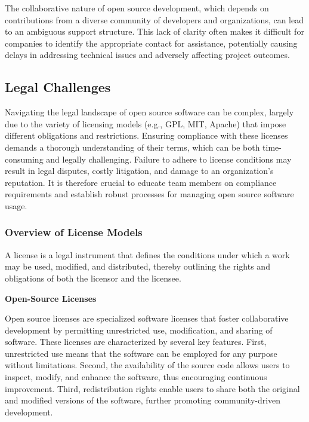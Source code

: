 The collaborative nature of open source development, which depends on contributions from a diverse community of developers and organizations, can lead to an ambiguous support structure. This lack of clarity often makes it difficult for companies to identify the appropriate contact for assistance, potentially causing delays in addressing technical issues and adversely affecting project outcomes.

\subsection{Legal Challenges}

Navigating the legal landscape of open source software can be complex, largely due to the variety of licensing models (e.g., GPL, MIT, Apache) that impose different obligations and restrictions. Ensuring compliance with these licenses demands a thorough understanding of their terms, which can be both time-consuming and legally challenging. Failure to adhere to license conditions may result in legal disputes, costly litigation, and damage to an organization’s reputation. It is therefore crucial to educate team members on compliance requirements and establish robust processes for managing open source software usage.

\cite{OpenSource-Legal-Guide}

\subsubsection{Overview of License Models}

A license is a legal instrument that defines the conditions under which a work may be used, modified, and distributed, thereby outlining the rights and obligations of both the licensor and the licensee.

\textbf{Open-Source Licenses}

Open source licenses are specialized software licenses that foster collaborative development by permitting unrestricted use, modification, and sharing of software. These licenses are characterized by several key features. First, unrestricted use means that the software can be employed for any purpose without limitations. Second, the availability of the source code allows users to inspect, modify, and enhance the software, thus encouraging continuous improvement. Third, redistribution rights enable users to share both the original and modified versions of the software, further promoting community-driven development.

